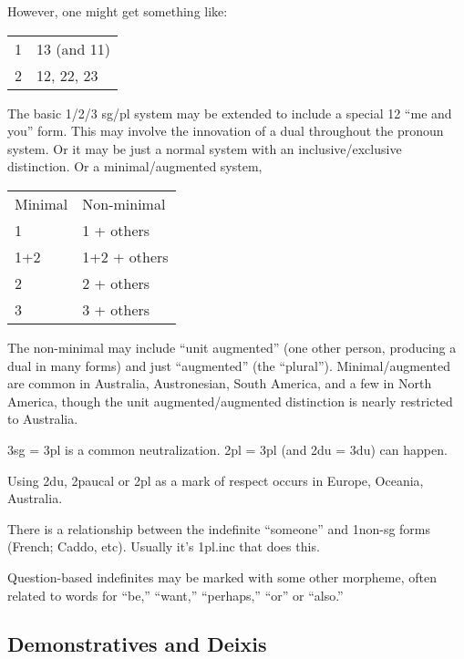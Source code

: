 \documentclass[11pt]{article}
\begin{document}
However, one might get something like:

\begin{center}
\begin{tabular}{ll}
1 & 13 (and 11) \\
2 & 12, 22, 23     
\end{tabular}
\end{center}

The basic 1/2/3 sg/pl system may be extended to include a special 12
``me and you'' form.  This may involve the innovation of a dual
throughout the pronoun system.  Or it may be just a normal system with
an inclusive/exclusive distinction.  Or a minimal/augmented system, 

\begin{center}
\begin{tabular}{ll}
Minimal & Non-minimal \\
1  & 1 + others \\
1+2 & 1+2 + others \\
2 & 2 + others \\
3 & 3 + others 
\end{tabular}
\end{center}

\noindent The non-minimal may include ``unit augmented'' (one other
person, producing a dual in many forms) and just ``augmented'' (the
``plural'').  Minimal/augmented are common in Australia, Austronesian,
South America, and a few in North America, though the unit
augmented/augmented distinction is nearly restricted to Australia.

3sg = 3pl is a common neutralization.  2pl = 3pl (and 2du = 3du) can
happen.

Using 2du, 2paucal or 2pl as a mark of respect occurs in Europe,
Oceania, Australia.

There is a relationship between the indefinite ``someone'' and
1non-sg forms (French; Caddo, etc).  Usually it's 1pl.inc that does
this. 

Question-based indefinites may be marked with some other morpheme,
often related to words for ``be,'' ``want,'' ``perhaps,'' ``or'' or
``also.''


\subsection{Demonstratives and Deixis}
\end{document}
